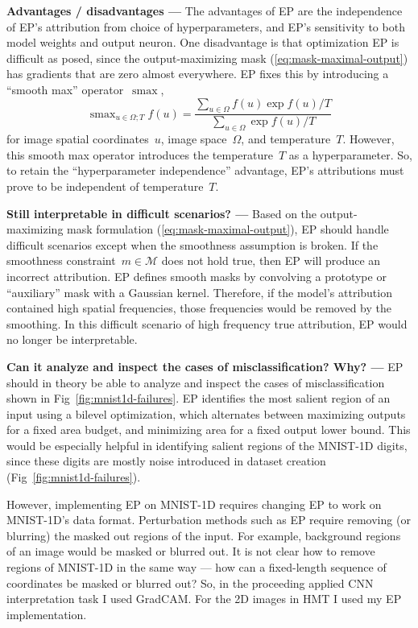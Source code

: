 \documentclass{article}
\DeclareMathOperator*{\smax}{smax}
\newcommand{\myparagraph}[1]{\noindent\textbf{#1 ---}}
\begin{document}
\myparagraph{Advantages / disadvantages} The advantages of EP are the independence of EP's attribution from choice of hyperparameters, and EP's sensitivity to both model weights and output neuron.
One disadvantage is that optimization EP is difficult as posed, since the output-maximizing mask (\ref{eq:mask-maximal-output}) has gradients that are zero almost everywhere.
EP fixes this by introducing a ``smooth max'' operator~$\smax$,
\begin{equation}
	\smax_{u\in\Omega; T} f(u) = \frac{\sum_{u\in\Omega}f(u)\exp f(u)/T}{\sum_{u\in\Omega}\exp f(u)/T}
	\label{eq:smax}
\end{equation}
for image spatial coordinates~$u$, image space~$\Omega$, and temperature~$T$.
However, this smooth max operator introduces the temperature~$T$ as a hyperparameter.
So, to retain the ``hyperparameter independence'' advantage, EP's attributions must prove to be independent of temperature~$T$.


\myparagraph{Still interpretable in difficult scenarios?} Based on the output-maximizing mask formulation (\ref{eq:mask-maximal-output}), EP should handle difficult scenarios except when the smoothness assumption is broken.
If the smoothness constraint~$m\in\mathcal{M}$ does not hold true, then EP will produce an incorrect attribution.
EP defines smooth masks by convolving a prototype or ``auxiliary'' mask with a Gaussian kernel.
Therefore, if the model's attribution contained high spatial frequencies, those frequencies would be removed by the smoothing.
In this difficult scenario of high frequency true attribution, EP would no longer be interpretable.


\myparagraph{Can it analyze and inspect the cases of misclassification? Why?} EP should in theory be able to analyze and inspect the cases of misclassification shown in Fig~\ref{fig:mnist1d-failures}.
EP identifies the most salient region of an input using a bilevel optimization, which alternates between maximizing outputs for a fixed area budget, and minimizing area for a fixed output lower bound.
This would be especially helpful in identifying salient regions of the MNIST-1D digits, since these digits are mostly noise introduced in dataset creation (Fig~\ref{fig:mnist1d-failures}).

However, implementing EP on MNIST-1D requires changing EP to work on MNIST-1D's data format.
Perturbation methods such as EP require removing (or blurring) the masked out regions of the input.
For example, background regions of an image would be masked or blurred out.
It is not clear how to remove regions of MNIST-1D in the same way --- how can a fixed-length sequence of coordinates be masked or blurred out?
So, in the proceeding applied CNN interpretation task I used GradCAM.
For the 2D images in HMT I used my EP implementation.
\end{document}
